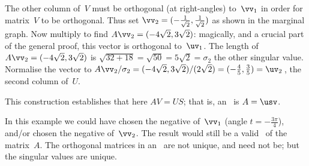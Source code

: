 \begin{example}
\begin{solution}
The other column of~\(V\) must be orthogonal (at right-angles) to~\(\vv_1\) in order for matrix~\(V\) to be orthogonal.
Thus set \(\vv_2=(-\frac1{\sqrt2},\frac1{\sqrt2})\) as shown in the marginal graph.
Now multiply to find \(A\vv_2=(-4\sqrt2,3\sqrt2)\):
magically, and a crucial part of the general proof, this vector is orthogonal to~\(\uv_1\).
The length of \(A\vv_2=(-4\sqrt2,3\sqrt2)\) is \(\sqrt{32+18}=\sqrt{50}=5\sqrt2=\sigma_2\) the other singular value.
Normalise the vector to \(A\vv_2/\sigma_2 =(-4\sqrt2,3\sqrt2)/(2\sqrt2)=(-\frac45,\frac35)=\uv_2\)\,, the second column of~\(U\).

This construction establishes that here \(AV=US\); that is, an \svd\ is \(A=\usv\).

In this example we could have chosen the negative of~\(\vv_1\) (angle \(t=-\frac{3\pi}4\)), and/or chosen the negative of~\(\vv_2\). 
The result would still be a valid \svd\ of the matrix~\(A\).
The orthogonal matrices in an \svd\ are not unique, and need not be; but the singular values are unique.
\end{solution}
\end{example}


